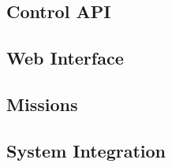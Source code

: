 \subsection{Control API}




\subsection{Web Interface}

\subsection{Missions}
\label{sec:web_design_missions}

\subsection{System Integration}